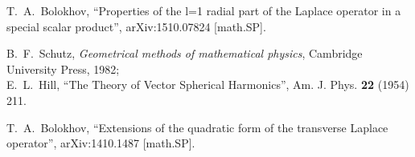 \documentclass[12pt]{article}
\begin{document}
\begin{thebibliography}{0}
 T.~A.~Bolokhov,
``Properties of the l=1 radial part of the Laplace operator in a special
scalar product'', arXiv:1510.07824 [math.SP].
    
    B.~F.~Schutz, \emph{Geometrical methods of mathematical physics},
    Cambridge University Press, 1982;\\
    E.~L.~Hill, ``The Theory of Vector Spherical Harmonics'',
    Am. J. Phys. {\bf 22} (1954) 211.

 T.~A.~Bolokhov,
``Extensions of the quadratic form of the transverse Laplace operator'',
arXiv:1410.1487 [math.SP].


\end{thebibliography}
\end{document}
